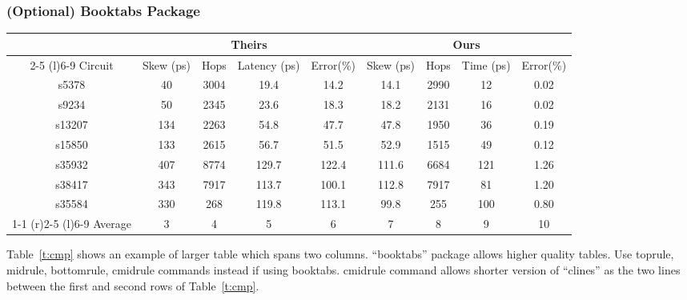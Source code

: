 \documentclass{jcse}
\begin{document}
\subsubsection{(Optional) Booktabs Package}

\begin{table*}
\centering
\caption{Comparison of results by their algorithm \cite{Zongker2006} and our algorithm.}
\label{t:cmp}
\begin{tabular} {ccccccccc}

\toprule
        & \multicolumn{4}{c}{Theirs \cite{Zongker2006}}  & \multicolumn{4}{c}{Ours} \\
\cmidrule(r){2-5} \cmidrule(l){6-9}
Circuit & Skew (ps) & Hops & Latency (ps) & Error(\%)    & Skew (ps) & Hops & Time (ps) & Error(\%) \\
\midrule
s5378   & 40        & 3004 & 19.4         & 14.2         & 14.1      & 2990 & 12        & 0.02 \\
s9234   & 50        & 2345 & 23.6         & 18.3         & 18.2      & 2131 & 16        & 0.02 \\
s13207  & 134       & 2263 & 54.8         & 47.7         & 47.8      & 1950 & 36        & 0.19 \\
s15850  & 133       & 2615 & 56.7         & 51.5         & 52.9      & 1515 & 49        & 0.12 \\
s35932  & 407       & 8774 & 129.7        & 122.4        & 111.6     & 6684 & 121       & 1.26 \\
s38417  & 343       & 7917 & 113.7        & 100.1        & 112.8     & 7917 & 81        & 1.20 \\
s35584  & 330       & 268  & 119.8        & 113.1        & 99.8      & 255  & 100       & 0.80 \\
\cmidrule(lr){1-1} \cmidrule(r){2-5} \cmidrule(l){6-9}
Average & 3         & 4    & 5            & 6            & 7         & 8    & 9         & 10   \\
\midrule

\end{tabular}
\end{table*}

Table~\ref{t:cmp} shows an example of larger table which spans two columns.
``booktabs'' package allows higher quality tables.
Use toprule, midrule, bottomrule, cmidrule commands instead if using booktabs.
cmidrule command allows shorter version of ``clines'' as the two lines
between the first and second rows of Table~\ref{t:cmp}.
\end{document}
